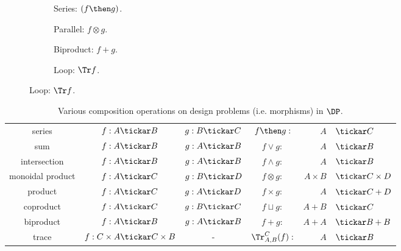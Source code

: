 \begin{figure}[h!]
\centering
\begin{subfigure}{0.2\textwidth}
\centering
{}
\caption{Series: $(f \then g)$.}
\end{subfigure}
\hspace{10mm} %
\begin{subfigure}{0.2\textwidth}
\centering
{}
\caption{Parallel: $f \otimes g$.}
\end{subfigure}
\hspace{10mm} %
\begin{subfigure}{0.2\textwidth}
\centering
{}
\caption{Biproduct: $f + g$.}
\end{subfigure}
\hspace{10mm} %
\begin{subfigure}{0.2\textwidth}
\centering
{}
\caption{Loop: $\Tr f$.}
\end{subfigure}
\label{fig:diagrams}
\end{figure}

\begin{table}[t!]
    \centering
\begin{tabular}{c|c|c|crl}
    series &
    $f:A\tickar B$&
    $g:B\tickar C$&
    $f\then g:$&$A$&$\tickar C$ \\
    sum &
    $f:A\tickar B$ &
    $g:A\tickar B$ &
    $f\vee g:$&$A$&$\tickar B$ \\
    intersection &
    $f:A\tickar B$ &
    $g:A\tickar B$ &
    $f\wedge g:$&$A$&$\tickar B$ \\
    monoidal product &
    $f:A\tickar C$&
    $g:B\tickar D$ &
    $f\otimes g:$&$A\times B$&$\tickar C \times D$ \\
    product &
    $f:A\tickar C$&
    $g:A\tickar D$ &
    $f\times g:$&$A $&$\tickar C + D$ \\
    coproduct &
    $f:A\tickar C$&
    $g:B\tickar C$ &
    $f\sqcup g:$&$A + B $&$\tickar C$ \\
    biproduct &
    $f:A\tickar B$ &
    $g:A\tickar B$ &
    $f+ g:$&$A + A$&$\tickar B + B$ \\
    trace &
    $f: C \times A \tickar C \times B$ &
    -&
    $\Tr_{A,B}^C(f) :$&$A$&$\tickar B$
\end{tabular}
    \caption{Various composition operations on design problems (i.e. morphisms) in $\DP$.}
\end{table}
